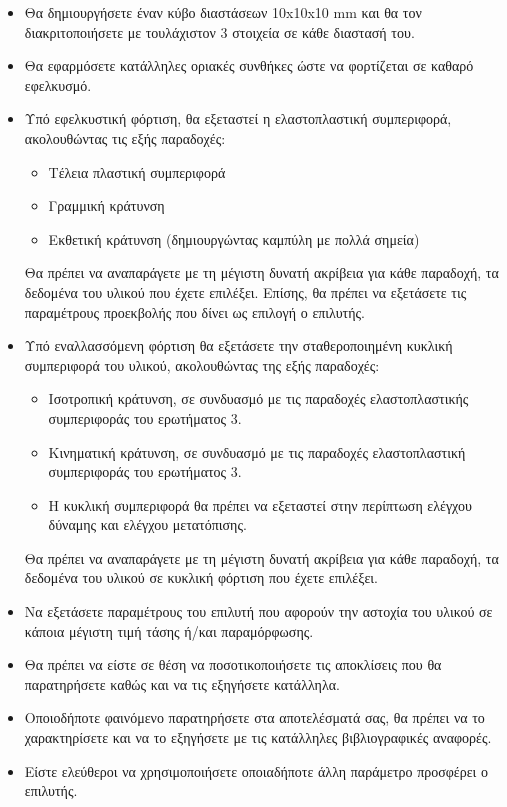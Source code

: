 \documentclass{article}
\begin{document}
\begin{itemize}
\item Θα δημιουργήσετε έναν κύβο διαστάσεων 10x10x10 mm και θα τον
διακριτοποιήσετε με τουλάχιστον 3 στοιχεία σε κάθε διαστασή του.
\item Θα εφαρμόσετε κατάλληλες οριακές συνθήκες ώστε να φορτίζεται σε καθαρό
εφελκυσμό.
\item Υπό εφελκυστική φόρτιση, θα εξεταστεί η ελαστοπλαστική συμπεριφορά,
ακολουθώντας τις εξής παραδοχές:
\begin{itemize}
\item Τέλεια πλαστική συμπεριφορά
\item Γραμμική κράτυνση
\item Εκθετική κράτυνση (δημιουργώντας καμπύλη με πολλά σημεία)
\end{itemize}
Θα πρέπει να αναπαράγετε με τη μέγιστη δυνατή ακρίβεια για κάθε παραδοχή, τα
δεδομένα του υλικού που έχετε επιλέξει. Επίσης, θα πρέπει να εξετάσετε τις
παραμέτρους προεκβολής που δίνει ως επιλογή ο επιλυτής.
\item Υπό εναλλασσόμενη φόρτιση θα εξετάσετε την σταθεροποιημένη κυκλική
συμπεριφορά του υλικού, ακολουθώντας της εξής παραδοχές:
\begin{itemize}
\item Ισοτροπική κράτυνση, σε συνδυασμό με τις παραδοχές ελαστοπλαστικής
συμπεριφοράς του ερωτήματος 3.
\item Κινηματική κράτυνση, σε συνδυασμό με τις παραδοχές ελαστοπλαστική
συμπεριφοράς του ερωτήματος 3.
\item Η κυκλική συμπεριφορά θα πρέπει να εξεταστεί στην περίπτωση ελέγχου
δύναμης και ελέγχου μετατόπισης.
\end{itemize}
Θα πρέπει να αναπαράγετε με τη μέγιστη δυνατή ακρίβεια για κάθε παραδοχή, τα
δεδομένα του υλικού σε κυκλική φόρτιση που έχετε επιλέξει.
\item Να εξετάσετε παραμέτρους του επιλυτή που αφορούν την αστοχία του υλικού σε
κάποια μέγιστη τιμή τάσης ή/και παραμόρφωσης.
\item Θα πρέπει να είστε σε θέση να ποσοτικοποιήσετε τις αποκλίσεις που θα
παρατηρήσετε καθώς και να τις εξηγήσετε κατάλληλα.
\item Οποιοδήποτε φαινόμενο παρατηρήσετε στα αποτελέσματά σας, θα πρέπει να το
χαρακτηρίσετε και να το εξηγήσετε με τις κατάλληλες βιβλιογραφικές αναφορές.
\item Είστε ελεύθεροι να χρησιμοποιήσετε οποιαδήποτε άλλη παράμετρο προσφέρει ο
επιλυτής.
\end{itemize}
\end{document}
